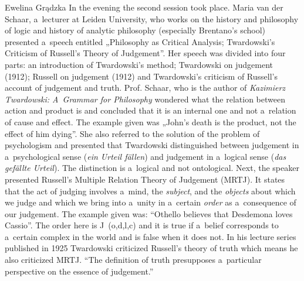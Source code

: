 \begin{editorialeng}{Ewelina Grądzka}
In the evening the second session took place. Maria van der Schaar, a~lecturer at Leiden University, who works on the history and philosophy of logic and history of analytic philosophy (especially Brentano’s school) presented a~speech entitled „Philosophy as Critical Analysis; Twardowski’s Criticism of Russell’s Theory of Judgement”. Her speech was divided into four parts: an introduction of Twardowski’s method; Twardowski on judgement (1912); Russell on judgement (1912) and Twardowski’s criticism of Russell’s account of judgement and truth. Prof. Schaar, who is the author of \textit{Kazimierz Twardowski: A~Grammar for Philosophy}
\parencite*[][]{schaar_kazimierz_2016} %
 wondered what the relation between action and product is and concluded that it is an internal one and not a~relation of cause and effect. The example given was „John’s death is the product, not the effect of him dying”. She also referred to the solution of the problem of psychologism and presented that Twardowski distinguished between judgement in a~psychological sense (\textit{ein Urteil fällen}) and judgement in a~logical sense (\textit{das gefällte Urteil}). The distinction is a~logical and not ontological. Next, the speaker presented Russell’s Multiple Relation Theory of Judgement (MRTJ). It states that the act of judging involves a~mind, the \textit{subject}, and the \textit{objects} about which we judge and which we bring into a~unity in a~certain \textit{order} as a~consequence of our judgement. The example given was: “Othello believes that Desdemona loves Cassio”. The order here is J~(o,d,l,c) and it is true if a~belief corresponds to a~certain complex in the world and is false when it does not. In his lecture series published in 1925 
\parencite*[][cf.]{brandl_theory_1999} %
 Twardowski criticized Russell’s theory of truth which means he also criticized MRTJ. “The definition of truth presupposes a~particular perspective on the essence of judgement.” 
\parencite[][]{brandl_theory_1999} %

\end{editorialeng}
